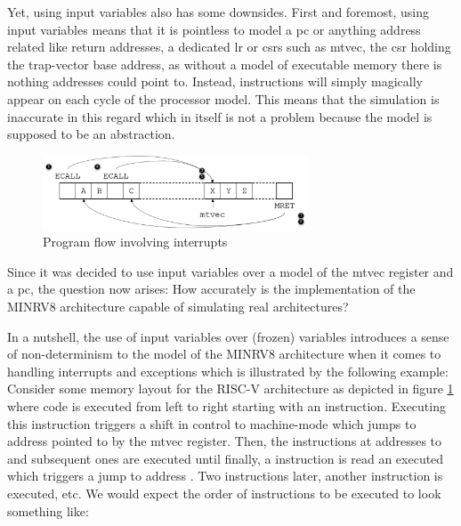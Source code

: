 Yet, using input variables also has some downsides.
First and foremost, using input variables means that it is pointless to model a \gls{pc} or anything address related like return addresses, a dedicated \gls{lr} or \glspl{csr} such as \gls{mtvec}, the \gls{csr} holding the trap-vector base address, as without a model of executable memory there is nothing addresses could point to.
Instead, instructions will simply magically appear on each cycle of the processor model.
This means that the simulation is inaccurate in this regard which in itself is not a problem because the model is supposed to be an abstraction.

\begin{figure}
    \centering
    \includegraphics[width=0.7\textwidth]{figures/interrupt-flow.png}
    \caption{Program flow involving interrupts}
    \label{fig:interrupt-flow}
\end{figure}

Since it was decided to use input variables over a model of the \gls{mtvec} register and a \gls{pc}, the question now arises: How accurately is the implementation of the MINRV8 architecture capable of simulating real architectures?

In a nutshell, the use of input variables over (frozen) variables introduces a sense of non-determinism to the model of the MINRV8 architecture when it comes to handling interrupts and exceptions which is illustrated by the following example:
Consider some memory layout for the RISC-V architecture as depicted in figure \ref{fig:interrupt-flow} where code is executed from left to right starting with an  instruction.
Executing this instruction triggers a shift in control to machine-mode which jumps to address  pointed to by the \gls{mtvec} register.
Then, the instructions at addresses  to  and subsequent ones are executed until finally, a  instruction is read an executed which triggers a jump to address .
Two instructions later, another  instruction is executed, etc.
We would expect the order of instructions to be executed to look something like:

